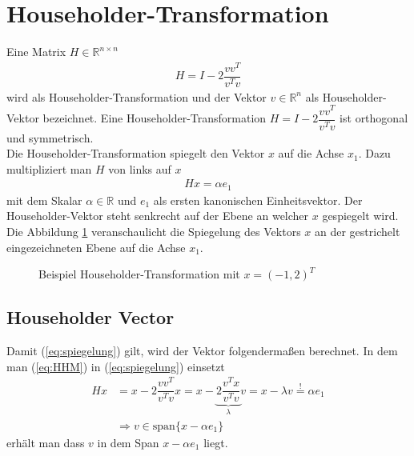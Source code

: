 \section{Householder-Transformation}
Eine Matrix $H \in \mathbb{R}^{n \times n}$ 
\begin{align}
	H = I - 2 \dfrac{vv^T}{v^Tv} \label{eq:HHM}
\end{align}
wird als Householder-Transformation und der Vektor $v \in \mathbb{R}^n$ als Householder-Vektor bezeichnet.
Eine Householder-Transformation $H = I - 2 \dfrac{vv^T}{v^Tv}$ ist orthogonal und symmetrisch. \cite{num1}\\
Die Householder-Transformation spiegelt den Vektor $x$ auf die Achse $x_1$.
Dazu multipliziert man $H$ von links auf $x$
\begin{align}
	Hx=\alpha e_1 \label{eq:spiegelung}
\end{align}
mit dem Skalar $\alpha \in \mathbb{R}$ und $e_1$ als ersten kanonischen Einheitsvektor. Der Householder-Vektor steht senkrecht auf der Ebene an welcher $x$ gespiegelt wird.\\
Die Abbildung \ref{fig:HHolder} veranschaulicht die Spiegelung des Vektors $x$ an der gestrichelt eingezeichneten Ebene auf die Achse $x_1$.
\begin{figure}[H]
	\centering
	
	\caption{Beispiel Householder-Transformation mit $x=(-1,2)^T$}
	\label{fig:HHolder}
\end{figure}




\subsection{Householder Vector}
Damit (\ref{eq:spiegelung}) gilt, wird der Vektor folgendermaßen berechnet. 
In dem man (\ref{eq:HHM}) in (\ref{eq:spiegelung}) einsetzt
\begin{align*}
	Hx &= x - 2\dfrac{vv^T}{v^Tv} x = x - \underbrace{2\dfrac{v^Tx}{v^Tv}}_{\lambda} v = x - \lambda v \overset{!}{=} \alpha e_1 \\
	&\Longrightarrow v \in \text{span}\{x - \alpha e_1\}
\end{align*}
erhält man dass $v$ in dem Span $x  - \alpha e_1$ liegt.\cite{num1}

